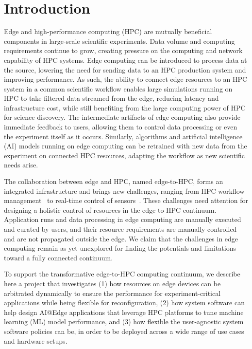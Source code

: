 \section{Introduction}
\label{sec:intro}



Edge and high-performance computing (HPC) are mutually beneficial components in large-scale scientific experiments. Data volume and computing requirements continue to grow, creating pressure on the computing and network capability of HPC systems. Edge computing can be introduced to process data at the source, lowering the need for sending data to an HPC production system and improving performance. As such, the ability to connect edge resources to an HPC system in a common scientific workflow enables large simulations running on HPC to take filtered data streamed from the edge, reducing latency and infrastructure cost, while still benefiting from the large computing power of HPC for science discovery. The intermediate artifacts of edge computing also provide immediate feedback to users, allowing them to control data processing or even the experiment itself as it occurs. Similarly, algorithms and artificial intelligence (AI) models running on edge computing can be retrained with new data from the experiment on connected HPC resources, adapting the workflow as new scientific needs arise.

The collaboration between edge and HPC, named edge-to-HPC, forms an integrated infrastructure and brings new challenges, ranging from HPC workflow management~\cite{dube2021future, badia2024integrating} to real-time control of sensors~\cite{kandel2023demonstration}. These challenges need attention for designing a holistic control of resources in the edge-to-HPC continuum. Application runs and data processing in edge computing are manually executed and curated by users, and their resource requirements are manually controlled and are not propagated outside the edge. We claim that the challenges in edge computing remain as yet unexplored for finding the potentials and limitations toward a fully connected continuum.

To support the transformative edge-to-HPC computing continuum, we describe here a project that investigates (1) how resources on edge devices can be arbitrated dynamically to ensure the performance for experiment-critical applications while being flexible for reconfiguration, (2) how system software can help design AI@Edge applications that leverage HPC platforms to tune machine learning (ML) model performance, and (3) how flexible the user-agnostic system software policies can be, in order to be deployed across a wide range of use cases and hardware setups.

